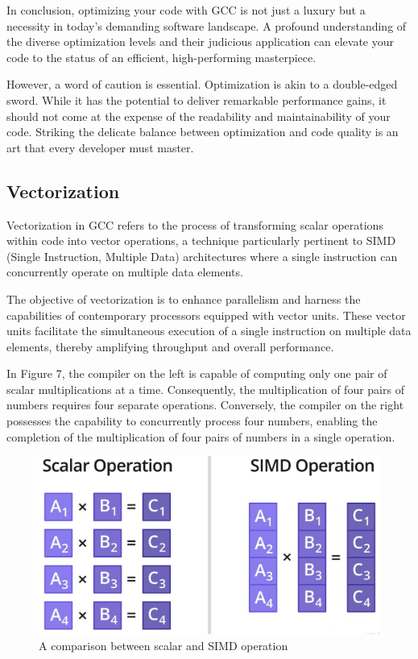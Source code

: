 \documentclass[conference]{IEEEtran}
\begin{document}
In conclusion, optimizing your code with GCC is not just a luxury but a necessity in today's demanding software landscape. A profound understanding of the diverse optimization levels and their judicious application can elevate your code to the status of an efficient, high-performing masterpiece.

However, a word of caution is essential. Optimization is akin to a double-edged sword. While it has the potential to deliver remarkable performance gains, it should not come at the expense of the readability and maintainability of your code. Striking the delicate balance between optimization and code quality is an art that every developer must master.

\subsection{Vectorization}

Vectorization in GCC refers to the process of transforming scalar operations within code into vector operations, a technique particularly pertinent to SIMD (Single Instruction, Multiple Data) architectures where a single instruction can concurrently operate on multiple data elements.

The objective of vectorization is to enhance parallelism and harness the capabilities of contemporary processors equipped with vector units. These vector units facilitate the simultaneous execution of a single instruction on multiple data elements, thereby amplifying throughput and overall performance.

In Figure 7, the compiler on the left is capable of computing only one pair of scalar multiplications at a time. Consequently, the multiplication of four pairs of numbers requires four separate operations. Conversely, the compiler on the right possesses the capability to concurrently process four numbers, enabling the completion of the multiplication of four pairs of numbers in a single operation.

\begin{figure}[htbp]
\centering
\includegraphics [width=0.8\linewidth]{pictures/SIMD.png}
\caption{A comparison between scalar and SIMD operation\cite{b5}}
\label{fig7}
\end{figure}
\end{document}
